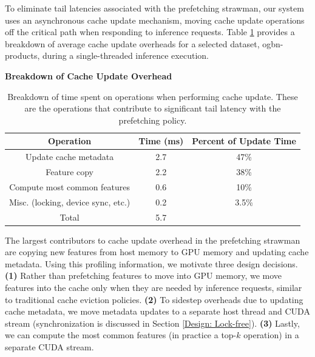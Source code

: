To eliminate tail latencies associated with the prefetching strawman, our system uses an asynchronous cache update mechanism, moving cache update operations off the critical path when responding to inference requests.
Table \ref{Update latencies} provides a breakdown of average cache update overheads for a selected dataset, ogbn-products, during a single-threaded inference execution.

\begin{table}[h!]
    \begin{center}
        \textbf{Breakdown of Cache Update Overhead}
        \begin{tabular}{|c c c|} 
        \hline
        \textbf{Operation} & \textbf{Time (ms)} & \textbf{Percent of Update Time} \\ [0.5ex] 
        \hline\hline
        Update cache metadata & 2.7 & 47\%  \\
        \hline
        Feature copy & 2.2 & 38\% \\
        \hline
        Compute most common features & 0.6 & 10\% \\
        \hline
        Misc. (locking, device sync, etc.) & 0.2 & 3.5\% \\
        \hline
        Total & 5.7 & \\
        \hline
        \end{tabular}
    \end{center}
    \caption{Breakdown of time spent on operations when performing cache update.
    These are the operations that contribute to significant tail latency with the prefetching policy.
    }
    \label{Update latencies}
\end{table}

The largest contributors to cache update overhead in the prefetching strawman are copying new features from host memory to GPU memory and updating cache metadata.
Using this profiling information, we motivate three design decisions.
\textbf{(1)} Rather than prefetching features to move into GPU memory, we move features into the cache only when they are needed by inference requests, similar to traditional cache eviction policies. 
\textbf{(2)} To sidestep overheads due to updating cache metadata, we move metadata updates to a separate host thread and CUDA stream (synchronization is discussed in Section \ref{Design: Lock-free}).
\textbf{(3)} Lastly, we can compute the most common features (in practice a top-$k$ operation) in a separate CUDA stream.

